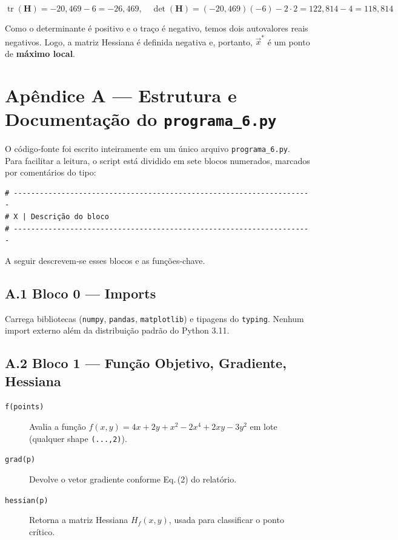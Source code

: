 \documentclass[12pt]{article}
\begin{document}
\[
\operatorname{tr}(\mathbf{H}) = -20{,}469 - 6 = -26{,}469, \quad
\det(\mathbf{H}) = (-20{,}469)(-6) - 2 \cdot 2 = 122{,}814 - 4 = 118{,}814
\]

Como o determinante é positivo e o traço é negativo, temos dois autovalores reais negativos. Logo, a matriz Hessiana é definida negativa e, portanto, $\vec{x}^*$ é um ponto de \textbf{máximo local}.

\newpage
\appendix
\section*{Apêndice A — Estrutura e Documentação do \texttt{programa\_6.py}}

O código‐fonte foi escrito inteiramente em um único arquivo \texttt{programa\_6.py}.  
Para facilitar a leitura, o script está dividido em sete blocos numerados,
marcados por comentários do tipo:
\begin{verbatim}
# ---------------------------------------------------------------------
# X | Descrição do bloco
# ---------------------------------------------------------------------
\end{verbatim}

A seguir descrevem‐se esses blocos e as funções-chave.

\subsection*{A.1 Bloco 0 — Imports}
Carrega bibliotecas (\texttt{numpy}, \texttt{pandas}, \texttt{matplotlib}) e tipagens
do \texttt{typing}.  
Nenhum import externo além da distribuição padrão do Python 3.11.

\subsection*{A.2 Bloco 1 — Função Objetivo, Gradiente, Hessiana}
\begin{description}
  \item[\texttt{f(points)}] Avalia a função
        $f(x,y)=4x+2y+x^2-2x^4+2xy-3y^2$ em lote (qualquer shape \texttt{(...,2)}).
  \item[\texttt{grad(p)}] Devolve o vetor gradiente conforme Eq.\,(2) do relatório.
  \item[\texttt{hessian(p)}] Retorna a matriz Hessiana $H_f(x,y)$, usada para
        classificar o ponto crítico.
\end{description}
\end{document}

